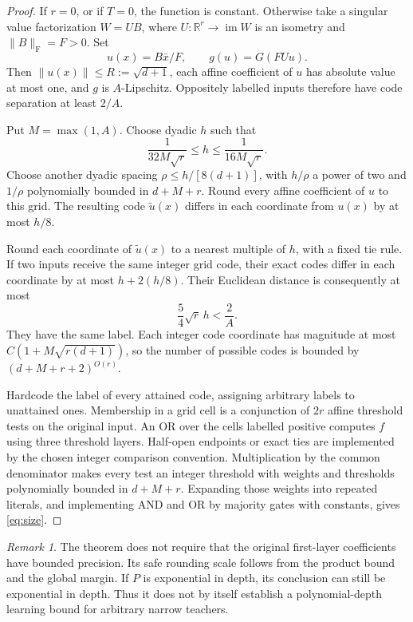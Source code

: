 \documentclass[11pt]{article}
\theoremstyle{remark}\newtheorem{remark}[theorem]{Remark}
\newcommand{\R}{\mathbb R}
\newcommand{\F}{\mathrm F}
\newcommand{\norm}[1]{\lVert #1\rVert}
\begin{document}
\begin{proof}
If $r=0$, or if $T=0$, the function is constant. Otherwise take a singular
value factorization $W=UB$, where $U:\R^r\to\operatorname{im}W$ is an
isometry and $\norm B_\F=F>0$. Set
\[
 u(x)=B\bar x/F,\qquad g(u)=G(FUu).
\]
Then $\norm{u(x)}\le R:=\sqrt{d+1}$, each affine coefficient of $u$ has
absolute value at most one, and $g$ is $A$-Lipschitz. Oppositely labelled
inputs therefore have code separation at least $2/A$.

Put $M=\max(1,A)$. Choose dyadic $h$ such that
\[
 \frac1{32M\sqrt r}\le h\le\frac1{16M\sqrt r}.
\]
Choose another dyadic spacing $\rho\le h/[8(d+1)]$, with $h/\rho$ a power
of two and $1/\rho$ polynomially bounded in $d+M+r$. Round every affine
coefficient of $u$ to this grid. The resulting code $\widetilde u(x)$
differs in each coordinate from $u(x)$ by at most $h/8$.

Round each coordinate of $\widetilde u(x)$ to a nearest multiple of $h$,
with a fixed tie rule. If two inputs receive the same integer grid code,
their exact codes differ in each coordinate by at most $h+2(h/8)$.
Their Euclidean distance is consequently at most
\[
 \frac54\sqrt r\,h<\frac2A.
\]
They have the same label. Each integer code coordinate has magnitude at
most $C(1+M\sqrt{r(d+1)})$, so the number of possible codes is bounded by
$(d+M+r+2)^{O(r)}$.

Hardcode the label of every attained code, assigning arbitrary labels to
unattained ones. Membership in a grid cell is a conjunction of $2r$
affine threshold tests on the original input. An OR over the cells labelled
positive computes $f$ using three threshold layers. Half-open endpoints
or exact ties are implemented by the chosen integer comparison convention.
Multiplication by the common denominator makes every test an integer
threshold with weights and thresholds polynomially bounded in $d+M+r$.
Expanding those weights into repeated literals, and implementing AND and
OR by majority gates with constants, gives \eqref{eq:size}.
\end{proof}

\begin{remark}
The theorem does not require that the original first-layer coefficients
have bounded precision. Its safe rounding scale follows from the product
bound and the global margin. If $P$ is exponential in depth, its conclusion
can still be exponential in depth. Thus it does not by itself establish a
polynomial-depth learning bound for arbitrary narrow teachers.
\end{remark}
\end{document}
